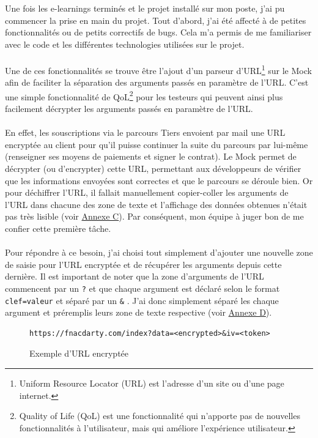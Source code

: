 \documentclass[12pt, a4paper]{report}
\begin{document}
	\noindent
	Une fois les e-learnings terminés et le projet installé sur mon poste, j'ai pu commencer la prise en main du projet. Tout d'abord, j'ai été affecté à de petites fonctionnalités ou de petits correctifs de bugs. Cela m'a permis de me familiariser avec le code et les différentes technologies utilisées sur le projet. 
	\\\\
	Une de ces fonctionnalités se trouve être l'ajout d'un parseur d'URL\footnote{Uniform Resource Locator (URL) est l'adresse d'un site ou d'une page internet.} sur le Mock afin de faciliter la séparation des arguments passés en paramètre de l'URL. C'est une simple fonctionnalité de QoL\footnote{Quality of Life (QoL) est une fonctionnalité qui n'apporte pas de nouvelles fonctionnalités à l'utilisateur, mais qui améliore l'expérience utilisateur.} pour les testeurs qui peuvent ainsi plus facilement décrypter les arguments passés en paramètre de l'URL.
	\\\\
	En effet, les souscriptions via le parcours Tiers envoient par mail une URL encryptée au client pour qu'il puisse continuer la suite du parcours par lui-même (renseigner ses moyens de paiements et signer le contrat). Le Mock permet de décrypter (ou d'encrypter) cette URL, permettant aux développeurs de vérifier que les informations envoyées sont correctes et que le parcours se déroule bien.
	\newpage\noindent
	Or pour déchiffrer l'URL, il fallait manuellement copier-coller les arguments de l'URL dans chacune des zone de texte et l'affichage des données obtenues n'était pas très lisible (voir \hyperref[sec:mock_before]{Annexe C}). Par conséquent, mon équipe à juger bon de me confier cette première tâche. 
	\\\\
	Pour répondre à ce besoin, j'ai choisi tout simplement d'ajouter une nouvelle zone de saisie pour l'URL encryptée et de récupérer les arguments depuis cette dernière. Il est important de noter que la zone d'arguments de l'URL commencent par un \flqq{} \texttt{?} \frqq{} et que chaque argument est déclaré selon le format \flqq{} \texttt{clef=valeur} \frqq{} et séparé par un \flqq{} \texttt{\&} \frqq{}. J'ai donc simplement séparé les chaque argument et préremplis leurs zone de texte respective (voir \hyperref[sec:mock_after]{Annexe D}).
	
	\begin{figure}[!h]
		\begin{verbatim}
https://fnacdarty.com/index?data=<encrypted>&iv=<token>
		\end{verbatim}
		\vspace{-.8cm}
		\caption{Exemple d'URL encryptée}
	\end{figure}
	
\end{document}
